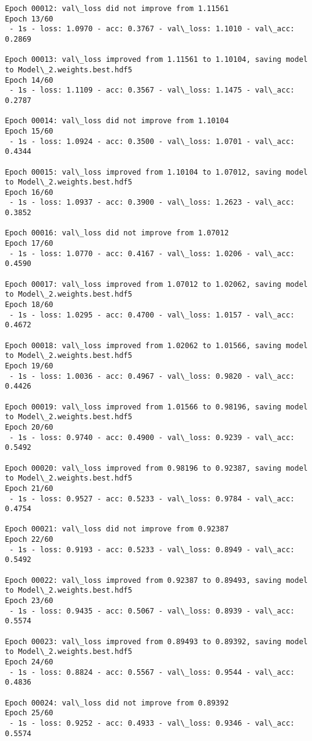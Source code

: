 \documentclass[11pt]{article}
\begin{document}
\begin{Verbatim}[commandchars=\\\{\}]
Epoch 00012: val\_loss did not improve from 1.11561
Epoch 13/60
 - 1s - loss: 1.0970 - acc: 0.3767 - val\_loss: 1.1010 - val\_acc: 0.2869

Epoch 00013: val\_loss improved from 1.11561 to 1.10104, saving model to Model\_2.weights.best.hdf5
Epoch 14/60
 - 1s - loss: 1.1109 - acc: 0.3567 - val\_loss: 1.1475 - val\_acc: 0.2787

Epoch 00014: val\_loss did not improve from 1.10104
Epoch 15/60
 - 1s - loss: 1.0924 - acc: 0.3500 - val\_loss: 1.0701 - val\_acc: 0.4344

Epoch 00015: val\_loss improved from 1.10104 to 1.07012, saving model to Model\_2.weights.best.hdf5
Epoch 16/60
 - 1s - loss: 1.0937 - acc: 0.3900 - val\_loss: 1.2623 - val\_acc: 0.3852

Epoch 00016: val\_loss did not improve from 1.07012
Epoch 17/60
 - 1s - loss: 1.0770 - acc: 0.4167 - val\_loss: 1.0206 - val\_acc: 0.4590

Epoch 00017: val\_loss improved from 1.07012 to 1.02062, saving model to Model\_2.weights.best.hdf5
Epoch 18/60
 - 1s - loss: 1.0295 - acc: 0.4700 - val\_loss: 1.0157 - val\_acc: 0.4672

Epoch 00018: val\_loss improved from 1.02062 to 1.01566, saving model to Model\_2.weights.best.hdf5
Epoch 19/60
 - 1s - loss: 1.0036 - acc: 0.4967 - val\_loss: 0.9820 - val\_acc: 0.4426

Epoch 00019: val\_loss improved from 1.01566 to 0.98196, saving model to Model\_2.weights.best.hdf5
Epoch 20/60
 - 1s - loss: 0.9740 - acc: 0.4900 - val\_loss: 0.9239 - val\_acc: 0.5492

Epoch 00020: val\_loss improved from 0.98196 to 0.92387, saving model to Model\_2.weights.best.hdf5
Epoch 21/60
 - 1s - loss: 0.9527 - acc: 0.5233 - val\_loss: 0.9784 - val\_acc: 0.4754

Epoch 00021: val\_loss did not improve from 0.92387
Epoch 22/60
 - 1s - loss: 0.9193 - acc: 0.5233 - val\_loss: 0.8949 - val\_acc: 0.5492

Epoch 00022: val\_loss improved from 0.92387 to 0.89493, saving model to Model\_2.weights.best.hdf5
Epoch 23/60
 - 1s - loss: 0.9435 - acc: 0.5067 - val\_loss: 0.8939 - val\_acc: 0.5574

Epoch 00023: val\_loss improved from 0.89493 to 0.89392, saving model to Model\_2.weights.best.hdf5
Epoch 24/60
 - 1s - loss: 0.8824 - acc: 0.5567 - val\_loss: 0.9544 - val\_acc: 0.4836

Epoch 00024: val\_loss did not improve from 0.89392
Epoch 25/60
 - 1s - loss: 0.9252 - acc: 0.4933 - val\_loss: 0.9346 - val\_acc: 0.5574


\end{Verbatim}
\end{document}
